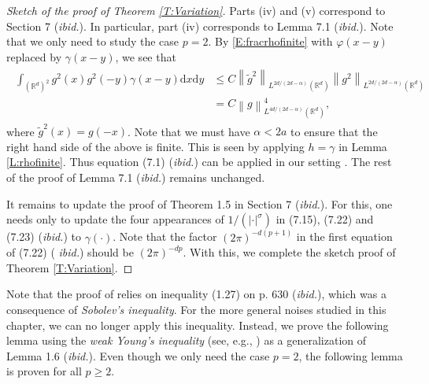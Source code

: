 \documentclass[12pt]{report}
\theoremstyle{plain}
\theoremstyle{definition}
\numberwithin{equation}{section}
\newcommand{\R}{\mathbb{R}}
\newcommand{\Norm}[1]{\left\|  #1   \right\|}
\newcommand{\ud}{\ensuremath{ \mathrm{d} }}
\begin{document}
\begin{proof}[Sketch of the proof of Theorem \ref{T:Variation}]
	Parts (iv) and (v) correspond to Section 7 ({\it ibid.}). In particular, part (iv) corresponds to
	Lemma 7.1 ({\it ibid.}). Note that we only need to study the case $p=2$. By
	\eqref{E:fracrhofinite} with $\varphi(x-y)$ replaced by $\gamma(x-y)$, we see that
	\begin{align} \label{E:(7.1)}
	\begin{aligned}
	\int_{(\R^d)^2} g^2(x)g^2(-y) \gamma(x-y) \ud x \ud y
	& \le  C \Norm{\tilde{g}^2}_{L^{2d/(2d-\alpha)}(\R^d)} \Norm{g^2}_{L^{2d/(2d-\alpha)}(\R^d)} \\
	& =    C \Norm{g}_{L^{4d/(2d-\alpha)}(\R^d)}^4,
	\end{aligned}
	\end{align}
	where $\tilde{g}^2(x) = g(-x)$. Note that we must have $\alpha < 2a$ to ensure that the right hand
	side of the above is finite. This is seen by applying $h=\gamma$ in Lemma \ref{L:rhofinite}. Thus
	equation (7.1) ({\it ibid.}) can be applied in our setting . The rest of the proof of Lemma 7.1
	({\it ibid.}) remains unchanged.
	
	It remains to update the proof of Theorem 1.5 in Section 7 ({\it ibid.}). For this, one needs only
	to update the four appearances of $1/(|\cdot|^\sigma)$ in (7.15), (7.22) and (7.23) ({\it ibid.}) to
	$\gamma(\cdot)$. Note that the factor $(2\pi)^{-d(p+1)}$ in the first equation  of (7.22) ({\it
		ibid.}) should be $(2\pi)^{-dp}$. With this, we complete the sketch proof of Theorem
	\ref{T:Variation}.
\end{proof}

Note that the proof of \cite[Lemma 1.6]{bass.chen.ea:09:large} relies on inequality (1.27) on p.  630 ({\it ibid.}),
which was a consequence of {\it Sobolev's inequality}. For the more general noises studied in this
chapter, we can no longer apply this inequality. Instead, we prove the following lemma using the {\it
	weak Young's inequality} (see, e.g., \cite[p.107]{lieb.loss:97:analysis}) as a generalization of Lemma 1.6
({\it ibid.}).  Even though we only need the case $p=2$, the following lemma is proven for all $p\ge
2$.
\end{document}
